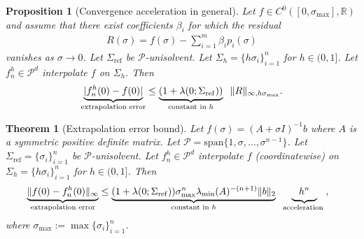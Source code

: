 \documentclass[10pt,a4paper]{amsart}
\newtheorem{theorem}{Theorem}
\newtheorem{proposition}{Proposition}
\newcommand{\nugget}{\sigma}
\newcommand{\nuggets}{\Sigma}
\begin{document}
\begin{proposition}[Convergence acceleration in general]
\label{thm: conv acc}
Let $f \in C^0([0,\nugget_{\max}],\mathbb{R})$ and assume that there exist coefficients $\beta_i$ for which the residual
\begin{align}
R(\sigma) = f(\sigma) - \sum_{ i = 1 }^m \beta_i p_i( \sigma )  \label{eq: error}
\end{align}
vanishes as $\sigma \rightarrow 0$.
Let $\Sigma_{\mathrm{ref}}$ be $\mathcal{P}$-unisolvent.
Let $\Sigma_h = \{ h \sigma_i\}_{i=1}^n$ for $h \in (0,1]$. 
Let $f_n^h \in \mathcal{P}^d$ interpolate $f$ on $\Sigma_h$.
Then 
\begin{align*}
\underbrace{ |  f_n^h(0) - f(0) | }_{\text{\normalfont extrapolation error}} \leq \underbrace{ ( 1 + \lambda(0; \Sigma_{\mathrm{ref}}) ) }_{\text{\normalfont constant in $h$}} \; \; \| R \|_{\infty, h \nugget_{\max}} .
\end{align*}
\end{proposition}

\begin{theorem}[Extrapolation error bound]
\label{cor: extrap error}
Let $f(\nugget) = (A + \nugget I)^{-1} b$ where $A$ is a symmetric positive definite matrix.
Let $\mathcal{P} = \mathrm{span}\{1 , \nugget , \dots, \nugget^{n-1}\}$.
Let $\nuggets_{\mathrm{ref}} = \{\nugget_i\}_{i=1}^n$ be $\mathcal{P}$-unisolvent.
Let $f_n^h \in \mathcal{P}^d$ interpolate $f$ (coordinatewise) on $\nuggets_h = \{h \nugget_i\}_{i=1}^n$ for $h \in (0,1]$.
Then 
\begin{align*}
&\underbrace{ \| f(0) - f_n^h(0) \|_\infty }_{\text{\normalfont extrapolation error}} \leq \underbrace{ ( 1 + \lambda(0; \nuggets_{\mathrm{ref}}) ) \nugget_{\max}^n \lambda_{\min}(A)^{-(n+1)} \|b\|_2  }_{\text{\normalfont constant in $h$}} \; \; \underbrace{ \phantom{|_p} h^n \phantom{|_p} }_{\text{\normalfont acceleration }} ,
\end{align*}
where $\nugget_{\max} := \max\{\nugget_i\}_{i=1}^n$.
\end{theorem}
\end{document}
